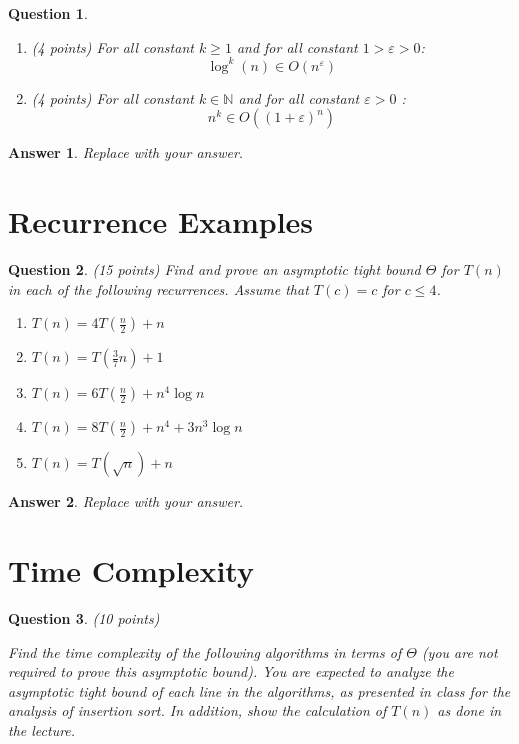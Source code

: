 \documentclass[a4paper]{article}
\theoremstyle{remarksStyle}
\theoremstyle{questionStyle}
\newtheorem{question}{Question}
\theoremstyle{answerStyle}
\newtheorem{answer}{Answer}
\begin{document}
\begin{question}
\begin{enumerate}
    \item (4 points) \label{q2:log} For all constant $k \ge 1$ and for all constant $1 > \varepsilon > 0$:
    \[ \log^k (n) \in O (n^\varepsilon) \]
    \item (4 points) \label{q2:exp} For all constant $k \in \mathbb{N}$ and for all constant $\varepsilon > 0$ :
    \[n^k \in O( (1 + \varepsilon)^n)\]
\end{enumerate}
\end{question}

\begin{answer}
    Replace with your answer.
\end{answer}

\newpage

\section {Recurrence Examples}
\begin{question} (15 points)
Find and prove an asymptotic tight bound $\Theta$ for $T(n)$ in each of the following recurrences. Assume that $T(c) = c$ for $c \le 4$.
\begin{enumerate}
    \item $T(n) = 4T(\frac{n}{2}) + n$
    \item $T(n) = T(\frac{3}{7}n) + 1$
    \item $T(n) = 6T(\frac{n}{2}) + n^4 \log{n}$
    \item $T(n) = 8T(\frac{n}{2}) + n^4 + 3n^3  \log{n} $
    \item $T(n) = T(\sqrt{n}) + n $
    
\end{enumerate}
\end{question}

\begin{answer}
    Replace with your answer.
\end{answer}

\vspace{2cm}

\section{Time Complexity}
\begin{question} (10 points)
    
Find the time complexity of the following algorithms in terms of $\Theta$ (you are not required to prove this asymptotic bound).
You are expected to analyze the asymptotic tight bound of each line in the algorithms, as presented in class for the analysis of insertion sort. 
In addition, show the calculation of $T(n)$ as done in the lecture.
\end{question}
\end{document}
